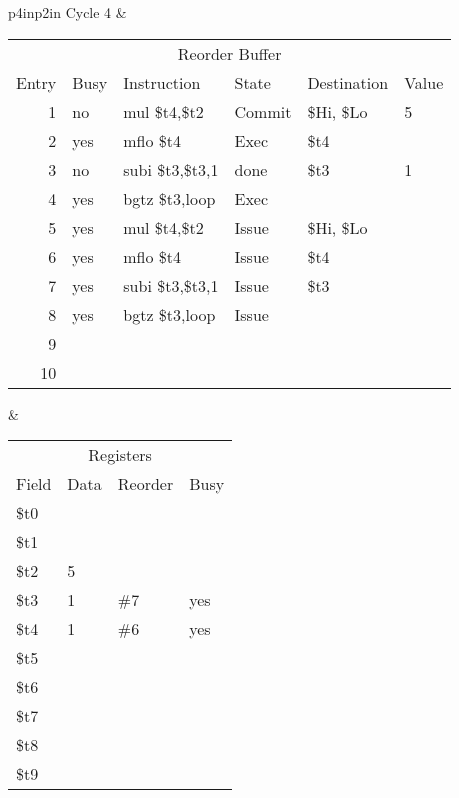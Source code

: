 \noindent
\begin{tabular}{p{4in}p{2in}}
Cycle 4 & \\ \hline \hline

\begin{tabular}{rlp{.9in}lll}
\multicolumn{6}{c}{Reorder Buffer} \\
Entry & Busy & Instruction        & State & Destination & Value \\ \hline
 1    & no   & mul  \$t4,\$t2     & Commit& \$Hi, \$Lo  & 5     \\
 2    & yes  & mflo \$t4          & Exec  & \$t4        &       \\
 3    & no   & subi \$t3,\$t3,1   & done  & \$t3        & 1     \\
 4    & yes  & bgtz \$t3,loop     & Exec  &             &       \\
 5    & yes  & mul  \$t4,\$t2     & Issue & \$Hi, \$Lo  &       \\
 6    & yes  & mflo \$t4          & Issue & \$t4        &       \\
 7    & yes  & subi \$t3,\$t3,1   & Issue & \$t3        &       \\
 8    & yes  & bgtz \$t3,loop     & Issue &             &       \\
 9    &      &                    &       &             &       \\
10    &      &                    &       &             &       \\
\end{tabular} &

\begin{tabular}{llll}
\multicolumn{4}{c}{Registers} \\
Field & Data & Reorder & Busy \\ \hline
\$t0  &      &         &      \\
\$t1  &      &         &      \\
\$t2  & 5    &         &      \\
\$t3  & 1    & \#7     & yes  \\
\$t4  & 1    & \#6     & yes  \\
\$t5  &      &         &      \\
\$t6  &      &         &      \\
\$t7  &      &         &      \\
\$t8  &      &         &      \\
\$t9  &      &         &      \\
\end{tabular} \\


\end{tabular}
